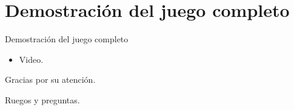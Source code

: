 \documentclass[10pt]{beamer}
\begin{document}
\section{Demostración del juego completo}
\begin{frame}{Demostración del juego completo}
\begin{itemize}[<+- | alert@+>]
	\item Video.
\end{itemize}
\end{frame}

\begin{frame}[standout]
  Gracias por su atención.
\end{frame}


\begin{frame}[standout]
  Ruegos y preguntas.
\end{frame}
\end{document}
